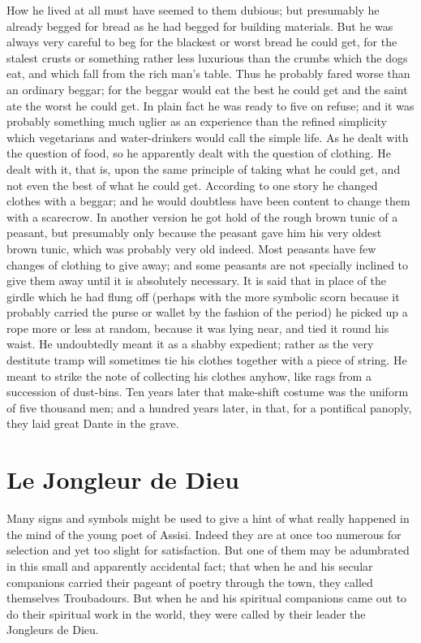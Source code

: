 \documentclass{book}
\begin{document}
How he lived at all must have seemed to them dubious; but presumably he already begged for bread as he had begged for building materials. But he was always very careful to beg for the blackest or worst bread he could get, for the stalest crusts or something rather less luxurious than the crumbs which the dogs eat, and which fall from the rich man’s table. Thus he probably fared worse than an ordinary beggar; for the beggar would eat the best he could get and the saint ate the worst he could get. In plain fact he was ready to five on refuse; and it was probably something much uglier as an experience than the refined simplicity which vegetarians and water-drinkers would call the simple life. As he dealt with the question of food, so he apparently dealt with the question of clothing. He dealt with it, that is, upon the same principle of taking what he could get, and not even the best of what he could get. According to one story he changed clothes with a beggar; and he would doubtless have been content to change them with a scarecrow. In another version he got hold of the rough brown tunic of a peasant, but presumably only because the peasant gave him his very oldest brown tunic, which was probably very old indeed. Most peasants have few changes of clothing to give away; and some peasants are not specially inclined to give them away until it is absolutely necessary. It is said that in place of the girdle which he had flung off (perhaps with the more symbolic scorn because it probably carried the purse or wallet by the fashion of the period) he picked up a rope more or less at random, because it was lying near, and tied it round his waist. He undoubtedly meant it as a shabby expedient; rather as the very destitute tramp will sometimes tie his clothes together with a piece of string. He meant to strike the note of collecting his clothes anyhow, like rags from a succession of dust-bins. Ten years later that make-shift costume was the uniform of five thousand men; and a hundred years later, in that, for a pontifical panoply, they laid great Dante in the grave.

\chapter{Le Jongleur de Dieu}
\label{chapter-4}
Many signs and symbols might be used to give a hint of what really happened in the mind of the young poet of Assisi. Indeed they are at once too numerous for selection and yet too slight for satisfaction. But one of them may be adumbrated in this small and apparently accidental fact; that when he and his secular companions carried their pageant of poetry through the town, they called themselves Troubadours. But when he and his spiritual companions came out to do their spiritual work in the world, they were called by their leader the Jongleurs de Dieu.
\end{document}
